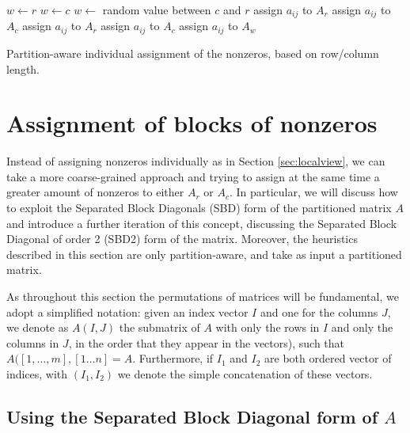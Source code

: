 \begin{algorithm}[h]
	\begin{algorithmic}
		\State
		\State $w \gets r$ 
		\State $w \gets c$
		\Else
		\State $w \gets$ random value between $c$ and $r$
		\EndIf
		\State assign $a_{ij}$ to $A_r$
		\State assign $a_{ij}$ to $A_c$
		\Else
		\State assign $a_{ij}$ to $A_r$
		\State assign $a_{ij}$ to $A_c$
		\Else
		\State assign $a_{ij}$ to $A_w$
		\EndIf
		\EndIf
		\EndFor
	\end{algorithmic}
	\caption{Partition-aware individual assignment of the nonzeros, based on row/column length.} \label{alg:localview-pa}
\end{algorithm}

\section{Assignment of blocks of nonzeros} \label{sec:sbd}

Instead of assigning nonzeros individually as in Section \ref{sec:localview}, we can take a more coarse-grained approach and trying to assign at the same time a greater amount of nonzeros to either $A_r$ or $A_c$. In particular, we will discuss how to exploit the Separated Block Diagonals (SBD) form of the partitioned matrix $A$ and introduce a further iteration of this concept, discussing the Separated Block Diagonal of order 2 (SBD2) form of the matrix. Moreover, the heuristics described in this section are only partition-aware, and take as input a partitioned matrix.

As throughout this section the permutations of matrices will be fundamental, we adopt a simplified notation: given an index vector $I$ and one for the columns $J$, we denote as $A(I,J)$ the submatrix of $A$ with only the rows in $I$ and only the columns in $J$, in the order that they appear in the vectors), such that $A([1,\dots,m],[1 \dots n] = A$. Furthermore, if $I_1$ and $I_2$ are both ordered vector of indices, with $(I_1,I_2)$ we denote the simple concatenation of these vectors.

\subsection{Using the Separated Block Diagonal form of $A$}

